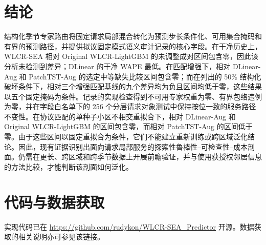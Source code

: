 \documentclass[10pt,conference,letterpaper]{IEEEtran}
\newcommand{\method}{WLCR-SEA}
\newcommand{\originalmethod}{Original WLCR-LightGBM}
\begin{document}
\section{结论}
结构化季节专家路由将固定请求局部混合转化为预测步长条件化、可用集合掩码和有界的预测路径，并提供拟议固定模式语义审计记录的核心字段。在干净历史上，\method{} 相对 \originalmethod{} 的未调整成对区间包含零，因此该分析未检测到差异；DLinear 的干净 WAPE 最低。在匹配增强下，相对 DLinear-Aug 和 PatchTST-Aug 的选定中等缺失比较区间包含零；而在列出的 50\% 结构化破坏条件下，相对三个增强匹配基线的九个差异均为负且区间均低于零，这些结果以五个固定掩码为条件。记录的实现检查得到不可用专家权重为零、有界包络违例为零，并在字段白名单下的 256 个分层请求对象测试中保持按位一致的服务路径不变性。在协议匹配的单种子小区不相交重拟合下，相对 DLinear-Aug 和 \originalmethod{} 的区间包含零，而相对 PatchTST-Aug 的区间低于零。由于这些区间以固定重拟合为条件，它们不能建立重新训练或跨区域泛化结论。因此，现有证据识别出面向请求局部服务的探索性鲁棒性--可检查性--成本剖面。仍需在更长、跨区域和跨季节数据上开展前瞻验证，并与使用获授权邻居信息的方法比较，才能判断该剖面如何泛化。

\section*{代码与数据获取}
实现代码已在
\url{https://github.com/rudykon/WLCR-SEA_Predictor}
开源。数据获取的相关说明亦可参见该链接。



\end{document}
